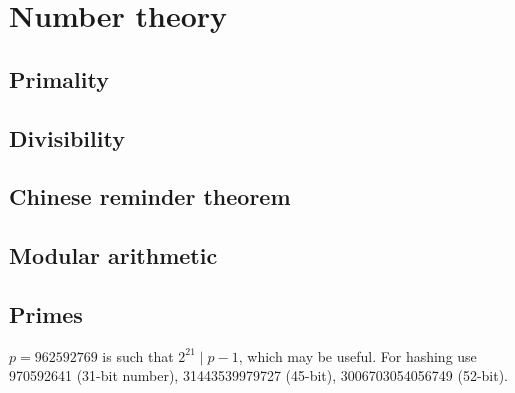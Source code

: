 
\chapter{Number theory}

	\section{Primality}

	\section{Divisibility}

	\section{Chinese reminder theorem}

	\section{Modular arithmetic}

	\section{Primes}
		$p=962592769$ is such that $2^{21} \mid p-1$, which may be useful. For hashing
		use 970592641 (31-bit number), 31443539979727 (45-bit), 3006703054056749
		(52-bit).
